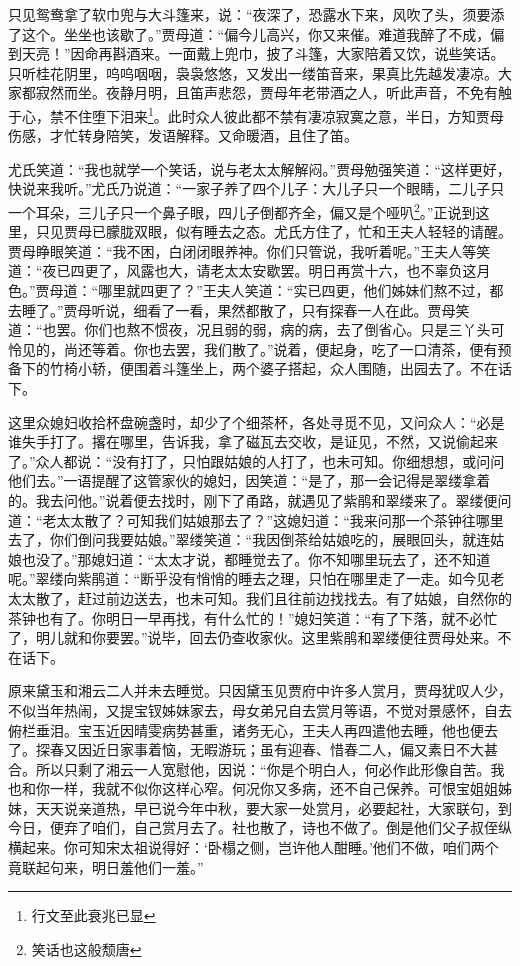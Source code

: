 \documentclass[12pt,oneside]{book}
\begin{document}
只见鸳鸯拿了软巾兜与大斗篷来，说：“夜深了，恐露水下来，风吹了头，须要添了这个。坐坐也该歇了。”贾母道：“偏今儿高兴，你又来催。难道我醉了不成，偏到天亮！”因命再斟酒来。一面戴上兜巾，披了斗篷，大家陪着又饮，说些笑话。只听桂花阴里，呜呜咽咽，袅袅悠悠，又发出一缕笛音来，果真比先越发凄凉。大家都寂然而坐。夜静月明，且笛声悲怨，贾母年老带酒之人，听此声音，不免有触于心，禁不住堕下泪来\footnote{行文至此衰兆已显}。此时众人彼此都不禁有凄凉寂寞之意，半日，方知贾母伤感，才忙转身陪笑，发语解释。又命暖酒，且住了笛。

尤氏笑道：“我也就学一个笑话，说与老太太解解闷。”贾母勉强笑道：“这样更好，快说来我听。”尤氏乃说道：“一家子养了四个儿子：大儿子只一个眼睛，二儿子只一个耳朵，三儿子只一个鼻子眼，四儿子倒都齐全，偏又是个哑叭\footnote{笑话也这般颓唐}。”正说到这里，只见贾母已朦胧双眼，似有睡去之态。尤氏方住了，忙和王夫人轻轻的请醒。贾母睁眼笑道：“我不困，白闭闭眼养神。你们只管说，我听着呢。”王夫人等笑道：“夜已四更了，风露也大，请老太太安歇罢。明日再赏十六，也不辜负这月色。”贾母道：“哪里就四更了？”王夫人笑道：“实已四更，他们姊妹们熬不过，都去睡了。”贾母听说，细看了一看，果然都散了，只有探春一人在此。贾母笑道：“也罢。你们也熬不惯夜，况且弱的弱，病的病，去了倒省心。只是三丫头可怜见的，尚还等着。你也去罢，我们散了。”说着，便起身，吃了一口清茶，便有预备下的竹椅小轿，便围着斗篷坐上，两个婆子搭起，众人围随，出园去了。不在话下。

这里众媳妇收拾杯盘碗盏时，却少了个细茶杯，各处寻觅不见，又问众人：“必是谁失手打了。撂在哪里，告诉我，拿了磁瓦去交收，是证见，不然，又说偷起来了。”众人都说：“没有打了，只怕跟姑娘的人打了，也未可知。你细想想，或问问他们去。”一语提醒了这管家伙的媳妇，因笑道：“是了，那一会记得是翠缕拿着的。我去问他。”说着便去找时，刚下了甬路，就遇见了紫鹃和翠缕来了。翠缕便问道：“老太太散了？可知我们姑娘那去了？”这媳妇道：“我来问那一个茶钟往哪里去了，你们倒问我要姑娘。”翠缕笑道：“我因倒茶给姑娘吃的，展眼回头，就连姑娘也没了。”那媳妇道：“太太才说，都睡觉去了。你不知哪里玩去了，还不知道呢。”翠缕向紫鹃道：“断乎没有悄悄的睡去之理，只怕在哪里走了一走。如今见老太太散了，赶过前边送去，也未可知。我们且往前边找找去。有了姑娘，自然你的茶钟也有了。你明日一早再找，有什么忙的！”媳妇笑道：“有了下落，就不必忙了，明儿就和你要罢。”说毕，回去仍查收家伙。这里紫鹃和翠缕便往贾母处来。不在话下。

原来黛玉和湘云二人并未去睡觉。只因黛玉见贾府中许多人赏月，贾母犹叹人少，不似当年热闹，又提宝钗姊妹家去，母女弟兄自去赏月等语，不觉对景感怀，自去俯栏垂泪。宝玉近因晴雯病势甚重，诸务无心，王夫人再四遣他去睡，他也便去了。探春又因近日家事着恼，无暇游玩；虽有迎春、惜春二人，偏又素日不大甚合。所以只剩了湘云一人宽慰他，因说：“你是个明白人，何必作此形像自苦。我也和你一样，我就不似你这样心窄。何况你又多病，还不自己保养。可恨宝姐姐姊妹，天天说亲道热，早已说今年中秋，要大家一处赏月，必要起社，大家联句，到今日，便弃了咱们，自己赏月去了。社也散了，诗也不做了。倒是他们父子叔侄纵横起来。你可知宋太祖说得好：‘卧榻之侧，岂许他人酣睡。’他们不做，咱们两个竟联起句来，明日羞他们一羞。”
\end{document}
